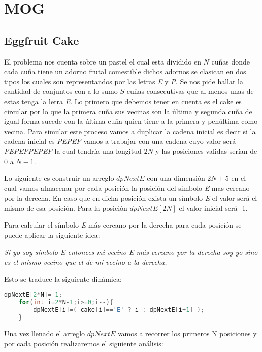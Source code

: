 \section{MOG}
\subsection{Eggfruit Cake} El problema nos cuenta sobre un pastel el cual esta dividido en $N$ cuñas donde cada cuña tiene un adorno frutal comestible dichos adornos se clasican en dos tipos los cuales son representandos por las letras \emph{E} y \emph{P}. Se nos pide hallar la cantidad de conjuntos con a lo sumo $S$ cuñas consecutivas que al menos unas de estas tenga la letra \emph{E}. 
Lo primero que debemos tener en cuenta es el cake es circular por lo que la primera cuña sus vecinas son la última y segunda cuña de igual forma sucede con la última cuña quien tiene a la primera y penúltima como vecina. Para simular este proceso vamos a duplicar la cadena inicial es decir si la cadena inicial es \emph{PEPEP} vamos a trabajar con una cadena cuyo valor será \emph{PEPEPPEPEP} la cual tendría una longitud $2N$ y las posiciones validas serían de $0$ a $N-1$. 

Lo siguiente es construir un arreglo $dpNextE$ con una dimensión $2N +5$ en el cual vamos almacenar por cada posición la posición del simbolo \emph{E} mas cercano por la derecha. En caso que en dicha posición exista un símbolo \emph{E} el valor será el mismo de esa posición. Para la posición  $dpNextE[2N]$ el valor inicial será -1.

Para calcular el símbolo \emph{E} más cercano por la derecha para cada posición se puede aplicar la siguiente idea:

\emph{Si yo soy símbolo E entonces mi vecino E más cercano por la derecha soy yo sino es el mismo vecino que el de mi vecino a la derecha.}

Esto se traduce la siguiente dinámica:


\begin{lstlisting}[language=C++]
	dpNextE[2*N]=-1;
	for(int i=2*N-1;i>=0;i--){
		dpNextE[i]=( cake[i]=='E' ? i : dpNextE[i+1] );
	}
\end{lstlisting} 


Una vez llenado el arreglo $dpNextE$ vamos a recorrer los primeros N posiciones y por cada posición realizaremos el siguiente análisis:

